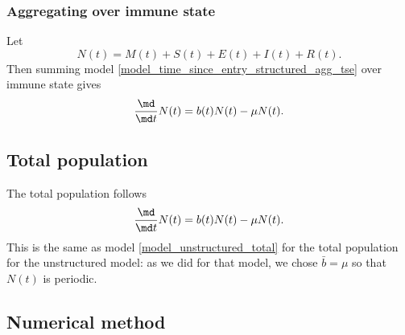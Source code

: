 \documentclass{jpmarticle}
\begin{document}
\subsubsection{Aggregating over immune state}

Let
\begin{equation}
  N(t)
  = M(t) + S(t) + E(t) + I(t) + R(t).
\end{equation}
Then summing model \eqref{model_time_since_entry_structured_agg_tse}
over immune state gives
\begin{equation}
  \label{model_time_since_entry_structured_agg_tse_state}
  \frac{\md}{\md t} N(t)
  = b(t) N(t) - \mu N(t).
\end{equation}


\subsection{Total population}

The total population follows
\begin{equation}
  \frac{\md}{\md t} N(t)
  = b(t) N(t) - \mu N(t).
\end{equation}
This is the same as model \eqref{model_unstructured_total} for the
total population for the unstructured model: as we did for that model,
we chose $\bar{b} = \mu$ so that $N(t)$ is periodic.


\subsection{Numerical method}
\end{document}
